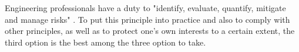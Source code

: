 \documentclass[12pt, a4paper]{article}
\begin{document}
Engineering professionals have a duty to "identify, evaluate, quantify, mitigate and manage risks" \cite{statement-of-ethical-principles}. To put this principle into practice and also to comply with other principles, as well as to protect one's own interests to a certain extent, the third option is the best among the three option to take.

  

\end{document}
